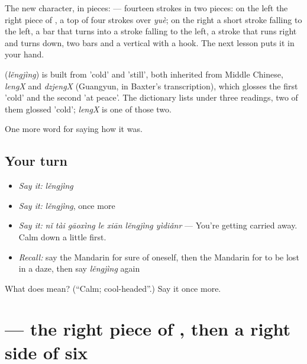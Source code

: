 The new character, in pieces:  — fourteen strokes in two pieces: on the left the right piece of , a top of four strokes over  \emph{yuè}; on the right a short stroke falling to the left, a bar that turns into a stroke falling to the left, a stroke that runs right and turns down, two bars and a vertical with a hook. The next lesson puts it in your hand.

\begin{cousinweb}
\textbf{} (\emph{lěngjìng}) is built from  'cold' and  'still', both inherited from Middle Chinese, \emph{lengX} and \emph{dzjengX} (Guangyun, in Baxter's transcription), which glosses the first 'cold' and the second 'at peace'. The dictionary lists  under three readings, two of them glossed 'cold'; \emph{lengX} is one of those two.
\end{cousinweb}

\begin{grammarlens}[title={What you've built}]
One more word for saying how it was.
\end{grammarlens}

\subsection*{Your turn}
\begin{itemize}
\raggedright
  \item \emph{Say it:} \emph{lěngjìng}
  \item \emph{Say it:} \emph{lěngjìng}, once more
  \item \emph{Say it:} \emph{nǐ tài gāoxìng le xiān lěngjìng yìdiǎnr} — You're getting carried away. Calm down a little first.
  \item \emph{Recall:} say the Mandarin for sure of oneself, then the Mandarin for to be lost in a daze, then say \emph{lěngjìng} again
\end{itemize}

\begin{tcolorbox}[breakable,colback=teal!4,colframe=teal!35!black,title={Before you move on}]
What does  mean? (\textquotedblleft{}Calm; cool-headed\textquotedblright{}.) Say it once more.
\end{tcolorbox}
\section[\texorpdfstring{\zh{静} (jìng)}{静 (jìng)}]{ — the right piece of , then a right side of six}

